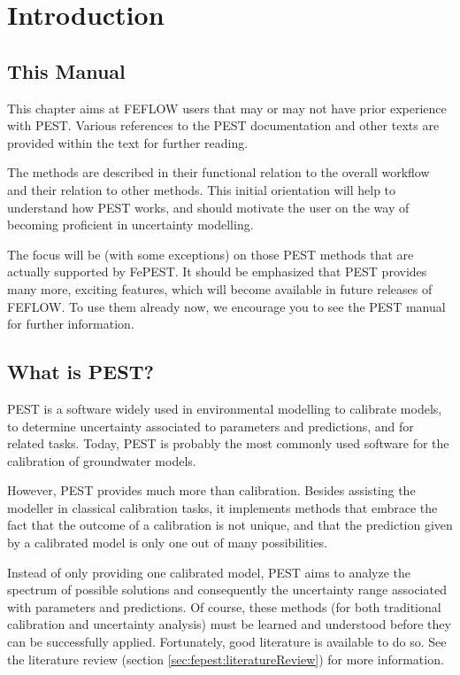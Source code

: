 \chapter{Introduction}

\section{This Manual}
\label{sec:fepest:ThisManual}

This chapter aims at FEFLOW users that may or may not have prior experience with PEST.
Various references to the PEST documentation and other texts are provided within the text for further reading. 

The methods are described in their functional relation to the overall workflow and their relation to other methods. This initial orientation will help to understand how PEST works, and should motivate the user on the way of becoming proficient in uncertainty modelling.

The focus will be (with some exceptions) on those PEST methods that are actually supported by FePEST. It should be emphasized that PEST provides many more, exciting features, which will become available in future releases of FEFLOW. To use them already now, we encourage you to see the PEST manual for further information.

\section{What is PEST?}

PEST is a software widely used in environmental modelling to calibrate models, to determine uncertainty associated to parameters and predictions, and for related tasks. Today, PEST is probably the most commonly used software for the calibration of groundwater models.

However, PEST provides much more than calibration. Besides assisting the modeller in classical calibration tasks, it implements methods that embrace the fact that the outcome of a calibration is not unique, and that the prediction given by a calibrated model is only one out of many possibilities.

Instead of only providing one calibrated model, PEST aims to analyze the spectrum of possible solutions and consequently the uncertainty range associated with parameters and predictions. Of course, these methods (for both traditional calibration and uncertainty analysis) must be learned and understood before they can be successfully applied. Fortunately, good literature is available to do so. See the literature review (section \ref{sec:fepest:literatureReview}) for more information.


